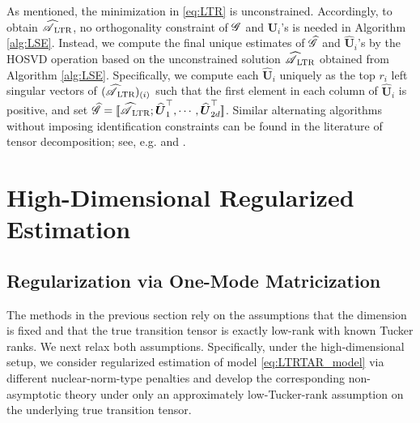 \documentclass[12pt]{article}
\newcommand{\bm}{\boldsymbol}
\newcommand{\cm}[1]{\mbox{\boldmath$\mathscr{#1}$}}
\begin{document}
As mentioned, the minimization in \eqref{eq:LTR} is unconstrained. Accordingly, to obtain $\cm{\widehat{A}}_{\text{LTR}}$, no orthogonality constraint of $\cm{G}$ and $\bm{U}_i$'s is needed in Algorithm \ref{alg:LSE}. Instead, we compute the final unique estimates of $\cm{\widehat{G}}$ and $\bm{\widehat{U}}_i$'s  by the  HOSVD operation based on the unconstrained solution $\cm{\widehat{A}}_{\text{LTR}}$ obtained from  Algorithm \ref{alg:LSE}. Specifically, we compute each $\bm{\widehat{U}}_i$ uniquely as the top $r_i$ left singular vectors of $(\cm{\widehat{A}}_{\text{LTR}})_{(i)}$ such that the first element in each column of $\bm{\widehat{U}}_i$ is positive, and set $\cm{\widehat{G}}=[\![\cm{\widehat{A}}_{\text{LTR}};\bm{\widehat{U}}_1^\top,\cdots,\bm{\widehat{U}}_{2d}^\top]\!]$. Similar alternating algorithms without imposing identification constraints can be found in the literature of tensor decomposition; see, e.g. \citet{Zhou13} and \citet{li2018tucker}.

%
%


\section{High-Dimensional Regularized Estimation\label{sec:HDM}}

\subsection{Regularization via One-Mode Matricization \label{subsec:1mode}}
The methods in the previous section rely on the assumptions that the dimension is fixed and that the true transition tensor is exactly low-rank with known Tucker ranks. We next relax both assumptions.  Specifically, under the high-dimensional setup, we consider regularized estimation of model \eqref{eq:LTRTAR_model} via different nuclear-norm-type penalties and develop the corresponding non-asymptotic theory under only an approximately low-Tucker-rank assumption on the  underlying true transition tensor.
\end{document}
